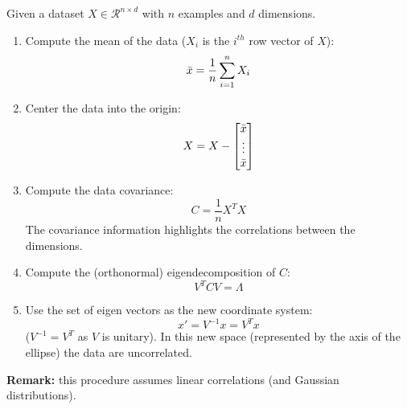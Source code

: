 Given a dataset $X \in \mathcal{R}^{n \times d}$ with $n$ examples and $d$ dimensions.

\begin{enumerate}
    \item Compute the mean of the data ($X_i$ is the $i^{th}$ row vector of $X$):
    \begin{equation*}
        \Bar{x} = \frac{1}{n} \sum_{i=1}^n X_i
    \end{equation*}
    
    \item Center the data into the origin:
    \begin{equation*}
        X = X - \begin{bmatrix}
          \Bar{x} \\
          \vdots \\
          \Bar{x}
        \end{bmatrix}
    \end{equation*}
    
    \item Compute the data covariance:
    \begin{equation*}
        C = \frac{1}{n} X^T X
    \end{equation*}
    The covariance information highlights the correlations between the dimensions.
    
    \item Compute the (orthonormal) eigendecomposition of $C$:
    \begin{equation*}
        V^T C V = \Lambda
    \end{equation*}
    
    \item Use the set of eigen vectors as the new coordinate system:
    \begin{equation*}
        x' = V^{-1}x = V^Tx
    \end{equation*}
    ($V^{-1} = V^T$ as $V$ is unitary).
    In this new space (represented by the axis of the ellipse) the data are uncorrelated.
\end{enumerate}

\textbf{Remark:} this procedure assumes linear correlations (and Gaussian distributions).

